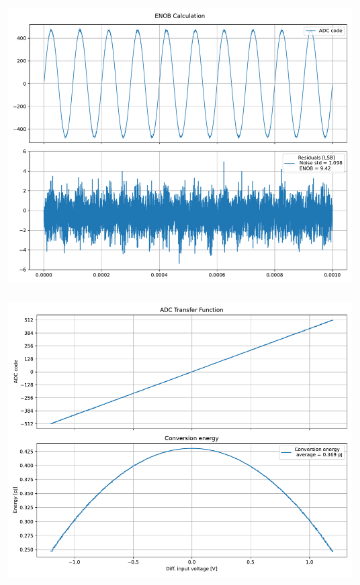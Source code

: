 \documentclass[varwidth]{standalone}
\begin{document}
\begin{figure}
\begin{subfigure}{0.32\textwidth}
    \includegraphics[width=\textwidth]{behavioral_10b_noisy_postconv_enob.pdf}
\end{subfigure}
\begin{subfigure}{0.32\textwidth}
    \begin{table}
    \let\center\empty
    \let\endcenter\relax
    \centering
    \resizebox{0.3\width}{!}{}
    \end{table}
    \includegraphics[width=\textwidth]{behavioral_10b_noisy_postconv_energy.pdf}
\end{subfigure}
\end{figure}
\end{document}
